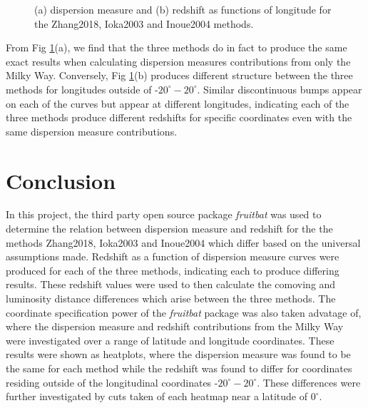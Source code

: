 \documentclass{article}
\begin{document}
\begin{figure}[!htb]
\centering
{}\hfill
{}
\caption{ (a) dispersion measure and (b) redshift as functions of longitude for the Zhang2018, Ioka2003 and Inoue2004 methods.}
\label{fig:heatplotcut}
\end{figure}

From Fig \ref{fig:heatplotcut}(a), we find that the three methods do in fact to produce the same exact results when calculating dispersion measures contributions from only the Milky Way. Conversely, Fig \ref{fig:heatplotcut}(b) produces different structure between the three methods for longitudes outside of -$20^\circ-20^\circ$. Similar discontinuous bumps appear on each of the curves but appear at different longitudes, indicating each of the three methods produce different redshifts for specific coordinates even with the same dispersion measure contributions.

\section{Conclusion}

In this project, the third party open source package \emph{fruitbat} was used to determine the relation between dispersion measure and redshift for the the methods Zhang2018, Ioka2003 and Inoue2004 which differ based on the universal assumptions made. Redshift as a function of dispersion measure curves were produced for each of the three methods, indicating each to produce differing results. These redshift values were used to then calculate the comoving and luminosity distance differences which arise between the three methods. The coordinate specification power of the \emph{fruitbat} package was also taken advatage of, where the dispersion measure and redshift contributions from the Milky Way were investigated over a range of latitude and longitude coordinates. These results were shown as heatplots, where the dispersion measure was found to be the same for each method while the redshift was found to differ for coordinates residing outside of the longitudinal coordinates -$20^\circ-20^\circ$. These differences were further investigated by cuts taken of each heatmap near a latitude of $0^\circ$.



\end{document}
